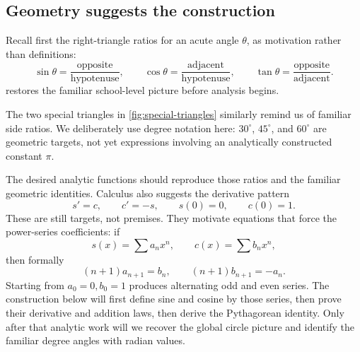 \subsection*{Geometry suggests the construction}
Recall first the right-triangle ratios for an acute angle \(\theta\), as
motivation rather than definitions:
\[
\sin\theta=\frac{\text{opposite}}{\text{hypotenuse}},\qquad
\cos\theta=\frac{\text{adjacent}}{\text{hypotenuse}},\qquad
\tan\theta=\frac{\text{opposite}}{\text{adjacent}}.
\]
 restores the familiar school-level picture
before analysis begins.


The two special triangles in \cref{fig:special-triangles} similarly remind us
of familiar side ratios. We deliberately use degree notation here:
$30^\circ$, $45^\circ$, and $60^\circ$ are geometric targets, not yet
expressions involving an analytically constructed constant $\pi$.


The desired analytic functions should reproduce those ratios and the
familiar geometric identities. Calculus also suggests the derivative pattern
\[
s'=c,\qquad c'=-s,\qquad s(0)=0,\qquad c(0)=1.
\]
These are still targets, not premises. They motivate equations that force the
power-series coefficients:
if
\[
s(x)=\sum a_nx^n,\qquad c(x)=\sum b_nx^n,
\]
 then formally
\[
(n+1)a_{n+1}=b_n,\qquad (n+1)b_{n+1}=-a_n.
\]
Starting from $a_0=0,b_0=1$ produces alternating odd and even series.
The construction below will first define sine and cosine by those series,
then prove their derivative and addition laws, then derive the Pythagorean
identity. Only after that analytic work will we recover the global circle
picture and identify the familiar degree angles with radian values.

